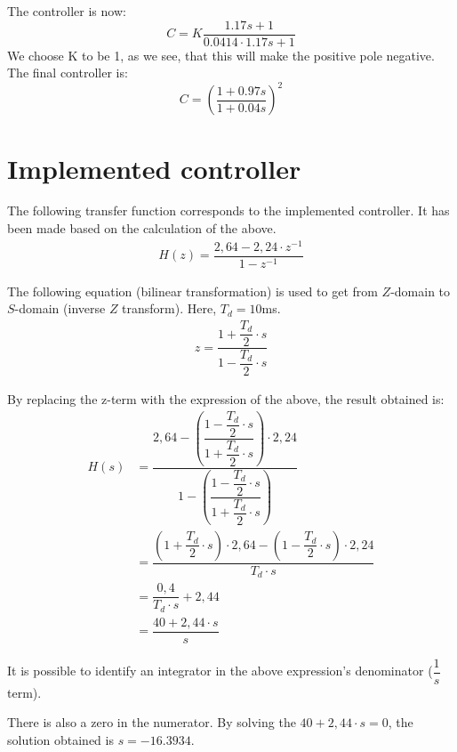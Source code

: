 The controller is now:
\begin{equation}
C=K\frac{1.17s +1}{0.0414\cdot 1.17s +1}
\end{equation}
We choose K to be 1, as we see, that this will make the positive pole negative. 
The final controller is:
\begin{equation}
C= (\frac{1+0.97s}{1+0.04s})^2
\end{equation}





\section{Implemented controller}

The following transfer function corresponds to the implemented controller. It has been made based on the calculation of the above.
\begin{align}
H(z)=\dfrac{2,64-2,24 \cdot z^{-1}}{1-z^{-1}}
\end{align}

The following equation (bilinear transformation) is used to get from $Z$-domain to $S$-domain (inverse $Z$ transform). Here, $T_{d}=10$ms.
\begin{align}
z=\dfrac{1+ \dfrac{T_{d}}{2} \cdot s}{1-\dfrac{T_{d}}{2} \cdot s}
\end{align}

By replacing the z-term with the expression of the above, the result obtained is:
\begin{align}
H(s) &= \dfrac{2,64- \left( \dfrac{1- \dfrac{T_{d}}{2} \cdot s}{1+ \dfrac{T_{d}}{2} \cdot s} \right) \cdot 2,24}{1- \left( \dfrac{1- \dfrac{T_{d}}{2} \cdot s}{1+ \dfrac{T_{d}}{2} \cdot s} \right) }\\
&= \dfrac{ \left( 1+ \dfrac{T_{d}}{2} \cdot s \right) \cdot 2,64- \left( 1- \dfrac{T_{d}}{2} \cdot s \right) \cdot 2,24}{T_{d} \cdot s}\\
&= \dfrac{0,4}{T_{d} \cdot s} + 2,44\\
&= \dfrac{40+2,44 \cdot s}{s}
\end{align}

It is possible to identify an integrator in the above expression's denominator ($\dfrac{1}{s}$ term).

There is also a zero in the numerator. By solving the $40+2,44 \cdot s=0$, the solution obtained is $s=-16.3934$.